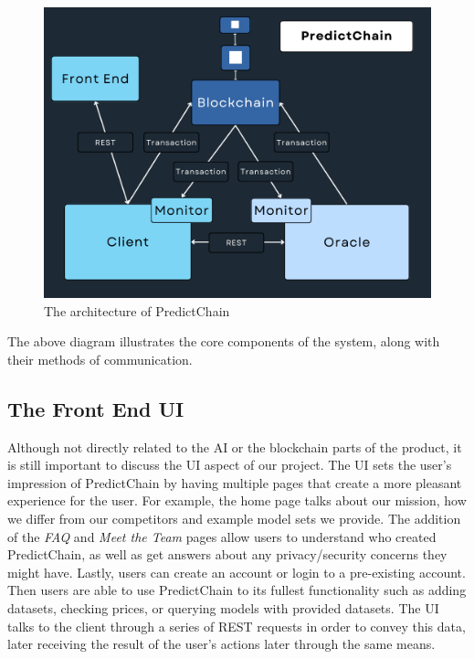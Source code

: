 \documentclass{ledger}
\begin{document}
\begin{figure}[H]
    \begin{center}
        \begin{minipage}{0.6\textwidth}
        \centering
        \includegraphics[width=\linewidth]{images/detailedDiagram}
        \caption{The architecture of PredictChain}\label{Fig:detailedDiagram}
    \end{minipage}\hfill
    \end{center}
\end{figure}

The above diagram illustrates the core components of the system, along with their methods of communication.

\subsection{The Front End UI}
Although not directly related to the AI or the blockchain parts of the product, it is still important to discuss the
UI aspect of our project. The UI sets the user's impression of PredictChain by having multiple pages that create a more
pleasant experience for the user. For example, the home page talks about our mission, how we differ from our
competitors and example model sets we provide. The addition of the \textit{FAQ} and \textit{Meet the Team} pages allow users to
understand who created PredictChain, as well as get answers about any privacy/security concerns they might have.
Lastly, users can create an account or login to a pre-existing account. Then users are able to use PredictChain
to its fullest functionality such as adding datasets, checking prices, or querying models with provided datasets.
The UI talks to the client through a series of REST requests in order to convey this data, later receiving the
result of the user's actions later through the same means.
\end{document}
